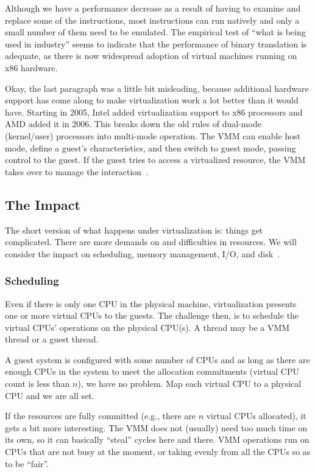 Although we have a performance decrease as a result of having to examine and replace some of the instructions, most instructions can run natively and only a small number of them need to be emulated. The empirical test of ``what is being used in industry'' seems to indicate that the performance of binary translation is adequate, as there is now widespread adoption of virtual machines running on x86 hardware.

Okay, the last paragraph was a little bit misleading, because additional hardware support has come along to make virtualization work a lot better than it would have. Starting in 2005, Intel added virtualization support to x86 processors and AMD added it in 2006. This breaks down the old rules of dual-mode (kernel/user) processors into multi-mode operation. The VMM can enable host mode, define a guest's characteristics, and then switch to guest mode, passing control to the guest. If the guest tries to access a virtualized resource, the VMM takes over to manage the interaction~\cite{osc}.


\subsection*{The Impact}

The short version of what happens under virtualization is: things get complicated. There are more demands on and difficulties in resources. We will consider the impact on scheduling, memory management, I/O, and disk~\cite{osc}.

\subsubsection*{Scheduling}

Even if there is only one CPU in the physical machine, virtualization presents one or more virtual CPUs to the guests. The challenge then, is to schedule the virtual CPUs' operations on the physical CPU(s). A thread may be a VMM thread or a guest thread.

A guest system is configured with some number of CPUs and as long as there are enough CPUs in the system to meet the allocation commitments (virtual CPU count is less than $n$), we have no problem. Map each virtual CPU to a physical CPU and we are all set. 

If the resources are fully committed (e.g., there are $n$ virtual CPUs allocated), it gets a bit more interesting. The VMM does not (usually) need too much time on its own, so it can basically ``steal'' cycles here and there. VMM operations run on CPUs that are not busy at the moment, or taking evenly from all the CPUs so as to be ``fair''. 

